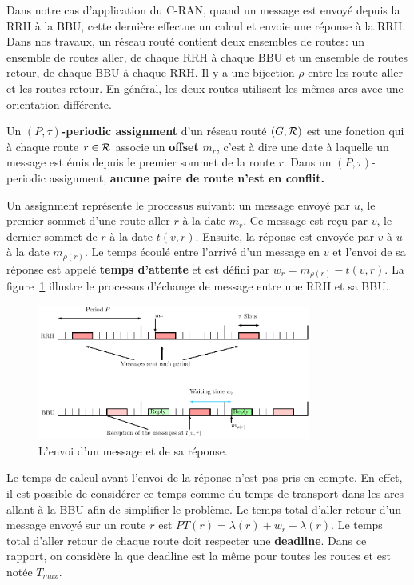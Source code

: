 \documentclass{article}
\begin{document}
      
      Dans notre cas d'application du C-RAN, quand un message est envoyé depuis la RRH à la BBU, cette dernière effectue un calcul et envoie une réponse à la RRH. Dans nos travaux, un réseau routé contient deux ensembles de routes:  un ensemble de  routes aller, de chaque RRH à chaque BBU et un ensemble de routes retour, de chaque BBU à chaque RRH. Il y a une bijection $\rho$ entre les route aller et les routes retour. En général, les deux routes utilisent les mêmes arcs avec une orientation différente.
      
  Un {\bf $(P,\tau)$-periodic assignment} d'un réseau routé $(G,\cal R)$ est une fonction qui à chaque route  $r \in \cal R$ associe un {\bf offset} $m_r$, c'est à dire une date à laquelle un message est émis depuis le premier sommet de la route $r$. Dans un $(P,\tau)$-periodic assignment, \textbf{aucune paire de route n'est en conflit.}
	 
      Un assignment représente le processus suivant: un message envoyé par $u$, le premier sommet d'une route aller $r$ à la date $m_r$. Ce message est reçu par $v$, le dernier sommet de $r$ à la date $t(v,r)$. Ensuite, la réponse est envoyée par $v$ à $u$ à la date $m_{\rho(r)}$. Le temps écoulé entre l'arrivé d'un message en $v$ et l'envoi de sa réponse est appelé {\bf temps d'attente} et est défini par $w_r = m_{\rho(r)} - t(v,r)$. La figure~\ref{fig:assignment} illustre le processus d'échange de message entre une RRH et sa BBU. 
      
     \begin{figure}[h]
      \begin{center}
      \includegraphics[width=0.8\textwidth]{rrh.pdf}
      \end{center}
      \caption{L'envoi d'un message et de sa réponse.}\label{fig:assignment}
      \end{figure}
      
Le temps de calcul avant l'envoi de la réponse n'est pas pris en compte. En effet, il est possible de considérer ce temps comme du temps de transport dans les arcs allant à la BBU afin de simplifier le problème.
      Le temps total d'aller retour d'un message envoyé sur un route $r$ est $PT(r)=\lambda(r)+ w_r+\lambda(r)$.      
      Le temps total d'aller retour de chaque route doit respecter une {\bf deadline}. Dans ce rapport, on considère la que deadline est la même pour toutes les routes et est notée $T_{max}$.
      
\end{document}
